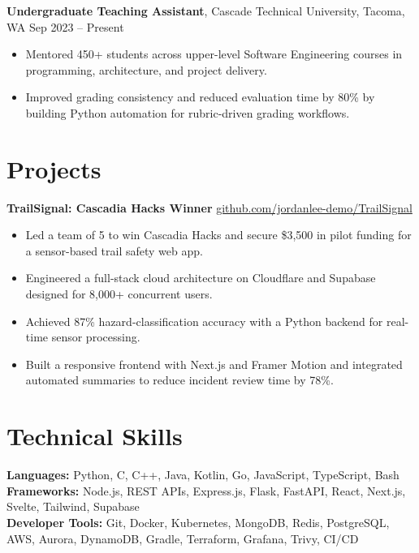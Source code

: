 \documentclass[10pt, letterpaper]{article}
\begin{document}
\textbf{Undergraduate Teaching Assistant}, Cascade Technical University, Tacoma, WA \hfill Sep 2023 -- Present
\begin{itemize}
    \item Mentored 450+ students across upper-level Software Engineering courses in programming, architecture, and project delivery.
    \item Improved grading consistency and reduced evaluation time by 80\% by building Python automation for rubric-driven grading workflows.
\end{itemize}

\section{Projects}
\textbf{TrailSignal: Cascadia Hacks Winner} \hfill \href{https://github.com/jordanlee-demo/TrailSignal}{github.com/jordanlee-demo/TrailSignal}
\begin{itemize}
    \item Led a team of 5 to win Cascadia Hacks and secure \$3,500 in pilot funding for a sensor-based trail safety web app.
    \item Engineered a full-stack cloud architecture on Cloudflare and Supabase designed for 8,000+ concurrent users.
    \item Achieved 87\% hazard-classification accuracy with a Python backend for real-time sensor processing.
    \item Built a responsive frontend with Next.js and Framer Motion and integrated automated summaries to reduce incident review time by 78\%.
\end{itemize}

\section{Technical Skills}
\textbf{Languages:} Python, C, C++, Java, Kotlin, Go, JavaScript, TypeScript, Bash\\
\textbf{Frameworks:} Node.js, REST APIs, Express.js, Flask, FastAPI, React, Next.js, Svelte, Tailwind, Supabase\\
\textbf{Developer Tools:} Git, Docker, Kubernetes, MongoDB, Redis, PostgreSQL, AWS, Aurora, DynamoDB, Gradle, Terraform, Grafana, Trivy, CI/CD
\end{document}
